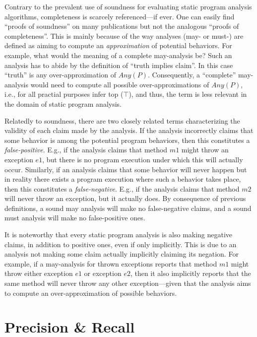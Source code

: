 Contrary to the prevalent use of soundness for evaluating static program analysis algorithms, completeness is scarcely referenced---if ever. One can easily find ``proofs of soundness'' on many publications but not the analogous ``proofs of completeness''. This is mainly because of the way analyses (may- or must-) are defined as aiming to compute an \emph{approximation} of potential behaviors. For example, what would the meaning of a complete may-analysis be? Such an analysis has to abide by the definition of ``truth implies claim''. In this case ``truth'' is any over-approximation of $Any(P)$. Consequently, a ``complete'' may-analysis would need to compute all possible over-approximations of $Any(P)$, i.e., for all practial purposes infer top ($\top$), and thus, the term is less relevant in the domain of static program analysis.

Relatedly to soundness, there are two closely related terms characterizing the validity of each claim made by the analysis. If the analysis incorrectly claims that some behavior is among the potential program behaviors, then this constitutes a \emph{false-positive}. E.g., if the analysis claims that method $m1$ might throw an exception $e1$, but there is no program execution under which this will actually occur. Similarly, if an analysis claims that some behavior will never happen but in reality there exists a program execution where such a behavior takes place, then this constitutes a \emph{false-negative}. E.g., if the analysis claims that method $m2$ will never throw an exception, but it actually does. By consequence of previous definitions, a sound may analysis will make no false-negative claims, and a sound must analysis will make no false-positive ones.

It is noteworthy that every static program analysis is also making negative claims, in addition to positive ones, even if only implicitly. This is due to an analysis not making some claim actually implicitly claiming its negation. For example, if a may-analysis for thrown exceptions reports that method $m1$ might throw either exception $e1$ or exception $e2$, then it also implicitly reports that the same method will never throw any other exception---given that the analysis aims to compute an over-approximation of possible behaviors.


\section{Precision \& Recall}
\label{sec:back:precision-recall}

